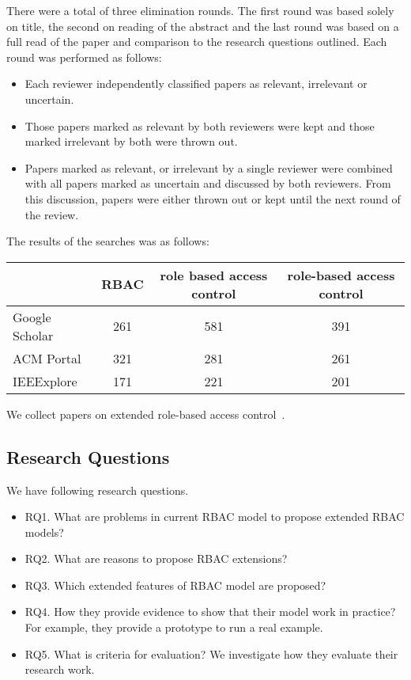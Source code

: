 There were a total of three elimination rounds.  The first round was based solely on title, the second on reading of the abstract and the last round was based on a full read of the paper and comparison to the research questions outlined.  Each round was performed as follows:

\begin{itemize}
  \item Each reviewer independently classified papers as relevant, irrelevant or uncertain.  
  \item Those papers marked as relevant by both reviewers were kept and those marked irrelevant by both were thrown out.  
  \item Papers marked as relevant, or irrelevant by a single reviewer were combined with all papers marked as uncertain and discussed by both reviewers.  From this discussion, papers were either thrown out or kept until the next round of the review.
\end{itemize}

The results of the searches was as follows:

\begin{center}
  \begin{tabular}{ l | c | c | c }
    \hline
     & RBAC & role based access control & role-based access control \\ \hline \hline
    Google Scholar & 261 & 581 & 391 \\ \hline
    ACM Portal & 321 & 281 & 261 \\ \hline
    IEEExplore & 171 & 221 & 201 \\ \hline
  \end{tabular}
\end{center}
    
We collect papers on extended role-based access control~\cite{ferraiolo:rbac}.

\subsection{Research Questions} \label{subsec:research questions}
We have following research questions.
\begin{itemize}
	\item RQ1. What are problems in current RBAC model to propose extended RBAC models?
	\item RQ2. What are reasons to propose RBAC extensions? 
	\item RQ3. Which extended features of RBAC model are proposed?
	\item RQ4. How they provide evidence to show that their model work in practice? For example, they provide a prototype to run a real example.
	\item RQ5. What is criteria for evaluation? We investigate how they evaluate their research work. 
	
\end{itemize}


